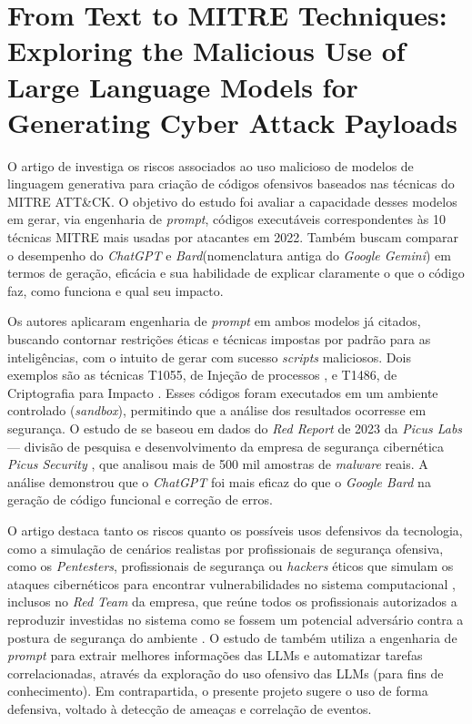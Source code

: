 \section{From Text to MITRE Techniques: Exploring the Malicious Use of Large Language Models for Generating Cyber Attack Payloads}

O artigo de  investiga os riscos associados ao uso malicioso de modelos de linguagem generativa para criação de códigos ofensivos baseados nas técnicas do MITRE ATT\&CK.
O objetivo do estudo foi avaliar a capacidade desses modelos em gerar, via engenharia de \textit{prompt}, códigos executáveis correspondentes às 10 técnicas MITRE mais usadas por atacantes em 2022.
Também buscam comparar o desempenho do \textit{ChatGPT} e \textit{Bard}(nomenclatura antiga do \textit{Google Gemini})
em termos de geração, eficácia e sua habilidade de explicar claramente o que o código faz, como funciona e qual seu impacto.

Os autores aplicaram engenharia de \textit{prompt} em ambos modelos já citados, 
buscando contornar restrições éticas e técnicas impostas por padrão para as inteligências, 
com o intuito de gerar com sucesso \textit{scripts} maliciosos.
Dois exemplos são as técnicas T1055, de Injeção de processos \cite{mitreDataImpact},
e T1486, de Criptografia para Impacto \cite{mitreDataImpact}.
Esses códigos foram executados em um ambiente controlado (\textit{sandbox}),
permitindo que a análise dos resultados ocorresse em segurança.
O estudo de  se baseou em dados do \textit{Red Report} de 2023 \cite{picus2023redreport} da \textit{Picus Labs} --- divisão de pesquisa e desenvolvimento da empresa de segurança cibernética \textit{Picus Security} \cite{picusAbout},
que analisou mais de 500 mil amostras de \textit{malware} reais. 
A análise demonstrou que o \textit{ChatGPT} foi mais eficaz do que o \textit{Google Bard} na geração de código funcional e correção de erros.

O artigo destaca tanto os riscos quanto os possíveis usos defensivos da tecnologia,
como a simulação de cenários realistas por profissionais de segurança ofensiva, como os \textit{Pentesters}, profissionais de segurança ou \textit{hackers} éticos que simulam os ataques cibernéticos para encontrar vulnerabilidades no sistema computacional \cite{ibm_penetration_testing}, inclusos no \textit{Red Team} da empresa, que reúne todos os profissionais autorizados a reproduzir investidas no sistema como se fossem um potencial adversário contra a postura de segurança do ambiente \cite{nist_red_team}.
O estudo de  também utiliza a engenharia de \textit{prompt} para extrair melhores informações das LLMs e automatizar tarefas correlacionadas, através da exploração do uso ofensivo das LLMs (para fins de conhecimento).
Em contrapartida, o presente projeto sugere o uso de forma defensiva, voltado à detecção de ameaças e correlação de eventos. 


